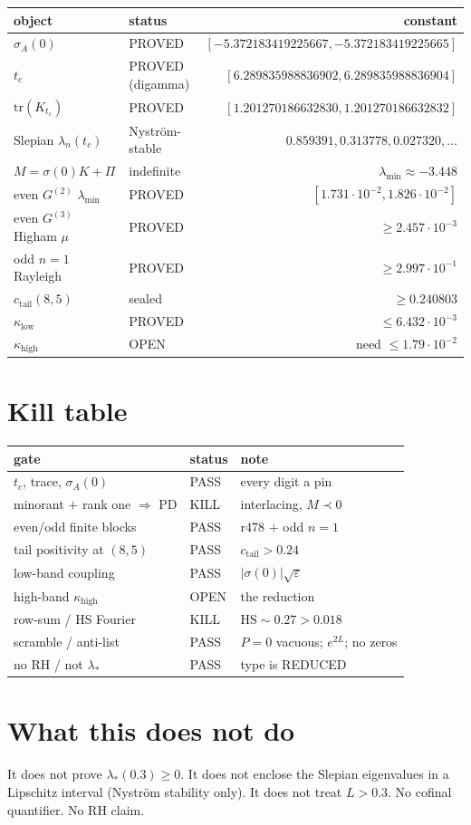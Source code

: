 \documentclass[11pt]{article}
\theoremstyle{remark}
\begin{document}
\begin{center}
\small
\begin{tabular}{@{}llr@{}}
\toprule
object & status & constant\\
\midrule
$\sigma_A(0)$ & PROVED & $[-5.372183419225667,-5.372183419225665]$\\
$t_c$ & PROVED (digamma) & $[6.289835988836902,6.289835988836904]$\\
$\mathrm{tr}(K_{t_c})$ & PROVED & $[1.201270186632830,1.201270186632832]$\\
Slepian $\lambda_n(t_c)$ & Nystr\"om-stable & $0.859391,0.313778,0.027320,\dots$\\
$M=\sigma(0)K+\Pi$ & indefinite & $\lambda_{\min}\approx-3.448$\\
even $G^{(2)}$ $\lambda_{\min}$ & PROVED & $[1.731\cdot10^{-2},1.826\cdot10^{-2}]$\\
even $G^{(3)}$ Higham $\mu$ & PROVED & $\ge2.457\cdot10^{-3}$\\
odd $n=1$ Rayleigh & PROVED & $\ge2.997\cdot10^{-1}$\\
$c_{\mathrm{tail}}(8,5)$ & sealed & $\ge0.240803$\\
$\kappa_{\mathrm{low}}$ & PROVED & $\le6.432\cdot10^{-3}$\\
$\kappa_{\mathrm{high}}$ & OPEN & need $\le1.79\cdot10^{-2}$\\
\bottomrule
\end{tabular}
\end{center}

\section{Kill table}

\begin{center}
\small
\begin{tabular}{@{}lll@{}}
\toprule
gate & status & note\\
\midrule
$t_c$, trace, $\sigma_A(0)$ & PASS & every digit a pin\\
minorant $+$ rank one $\Rightarrow$ PD & KILL & interlacing, $M\prec0$\\
even/odd finite blocks & PASS & r478 $+$ odd $n=1$\\
tail positivity at $(8,5)$ & PASS & $c_{\mathrm{tail}}>0.24$\\
low-band coupling & PASS & $|\sigma(0)|\sqrt{\varepsilon}$\\
high-band $\kappa_{\mathrm{high}}$ & OPEN & the reduction\\
row-sum / HS Fourier & KILL & $\mathrm{HS}\sim0.27>0.018$\\
scramble / anti-list & PASS & $P=0$ vacuous; $e^{2L}$; no zeros\\
no RH / not $\lambda_*$ & PASS & type is REDUCED\\
\bottomrule
\end{tabular}
\end{center}

\section{What this does not do}

It does not prove $\lambda_*(0.3)\ge0$.  It does not enclose
the Slepian eigenvalues in a Lipschitz interval (Nystr\"om
stability only).  It does not treat $L>0.3$.  No cofinal
quantifier.  No RH claim.
\end{document}
